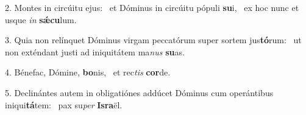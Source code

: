 2. Montes in circúitu ejus: \dag\  et Dóminus in circúitu pópuli \textbf{su}i, \ast\  ex hoc nunc et usque \textit{in} \textbf{sǽ}\textbf{cu}lum.\

3. Quia non relínquet Dóminus virgam peccatórum super sortem jus\textbf{tó}rum: \ast\  ut non exténdant justi ad iniquitátem ma\textit{nus} \textbf{su}as.\

4. Bénefac, Dómine, \textbf{bo}nis, \ast\  et rec\textit{tis} \textbf{cor}de.\

5. Declinántes autem in obligatiónes addúcet Dóminus cum operántibus iniqui\textbf{tá}tem: \ast\  pax su\textit{per} \textbf{Is}\textbf{ra}ël.\

